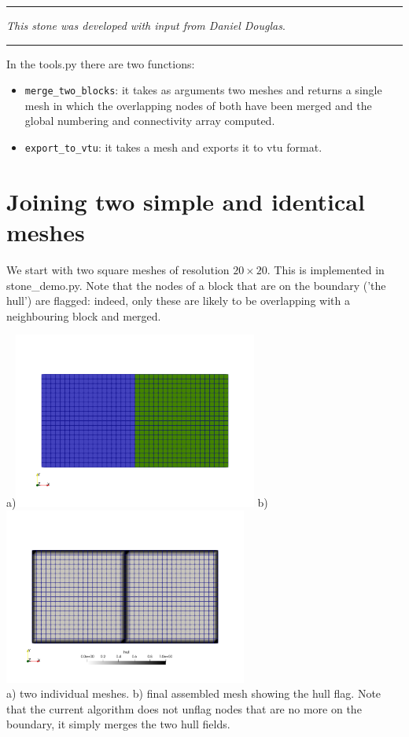 \par\noindent\rule{\textwidth}{0.4pt}

{\sl This stone was developed with input from Daniel Douglas}. 

\par\noindent\rule{\textwidth}{0.4pt}


In the {\pythonfile tools.py} there are two functions:
\begin{itemize}
\item \verb'merge_two_blocks': it takes as arguments two meshes and returns a single mesh in which 
the overlapping nodes of both have been merged and the global numbering and connectivity array computed.
\item \verb'export_to_vtu': it takes a mesh and exports it to vtu format.
\end{itemize}

\section*{Joining two simple and identical meshes}

We start with two square meshes of resolution $20 \times 20$. This is implemented 
in {\pythonfile stone\_demo.py}. Note that the nodes of a block that are on the boundary 
('the hull') are flagged: indeed, only these are likely to be overlapping with a neighbouring 
block and merged.

\begin{center}
a)\includegraphics[width=8cm]{python_codes/fieldstone_149/results/meshing/one}
b)\includegraphics[width=8cm]{python_codes/fieldstone_149/results/meshing/two}\\
{\captionfont a) two individual meshes. b) final assembled mesh showing the hull flag. Note that the current algorithm does 
not unflag nodes that are no more on the boundary, it simply merges the two hull fields.}
\end{center}


